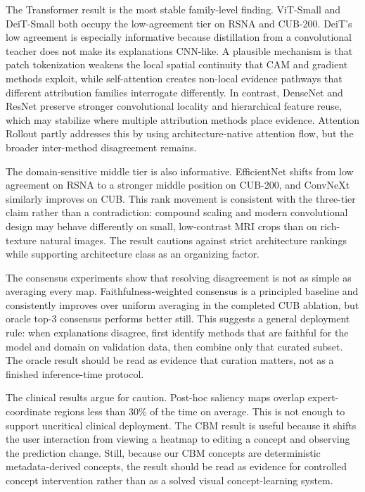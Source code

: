 \documentclass{bmvc2k}
\begin{document}
The Transformer result is the most stable family-level finding. ViT-Small and DeiT-Small both occupy the low-agreement tier on RSNA and CUB-200. DeiT's low agreement is especially informative because distillation from a convolutional teacher does not make its explanations CNN-like. A plausible mechanism is that patch tokenization weakens the local spatial continuity that CAM and gradient methods exploit, while self-attention creates non-local evidence pathways that different attribution families interrogate differently. In contrast, DenseNet and ResNet preserve stronger convolutional locality and hierarchical feature reuse, which may stabilize where multiple attribution methods place evidence. Attention Rollout partly addresses this by using architecture-native attention flow, but the broader inter-method disagreement remains.

The domain-sensitive middle tier is also informative. EfficientNet shifts from low agreement on RSNA to a stronger middle position on CUB-200, and ConvNeXt similarly improves on CUB. This rank movement is consistent with the three-tier claim rather than a contradiction: compound scaling and modern convolutional design may behave differently on small, low-contrast MRI crops than on rich-texture natural images. The result cautions against strict architecture rankings while supporting architecture class as an organizing factor.

The consensus experiments show that resolving disagreement is not as simple as averaging every map. Faithfulness-weighted consensus is a principled baseline and consistently improves over uniform averaging in the completed CUB ablation, but oracle top-$3$ consensus performs better still. This suggests a general deployment rule: when explanations disagree, first identify methods that are faithful for the model and domain on validation data, then combine only that curated subset. The oracle result should be read as evidence that curation matters, not as a finished inference-time protocol.

The clinical results argue for caution. Post-hoc saliency maps overlap expert-coordinate regions less than 30\% of the time on average. This is not enough to support uncritical clinical deployment. The CBM result is useful because it shifts the user interaction from viewing a heatmap to editing a concept and observing the prediction change. Still, because our CBM concepts are deterministic metadata-derived concepts, the result should be read as evidence for controlled concept intervention rather than as a solved visual concept-learning system.
\end{document}
